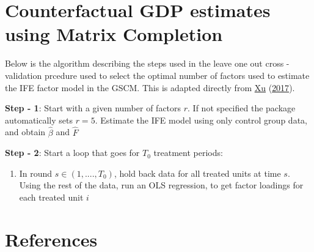 \documentclass[12pt,nobind, a4paper]{reedthesis}
\providecommand{\tightlist}{%
	\setlength{\itemsep}{0pt}\setlength{\parskip}{0pt}}
\begin{document}
 \appendix

 \hypertarget{counterfactual-gdp-estimates-using-matrix-completion}{%
 \chapter{Counterfactual GDP estimates using Matrix Completion}\label{counterfactual-gdp-estimates-using-matrix-completion}}

 Below is the algorithm describing the steps used in the leave one out cross - validation prcedure used to select the optimal number of factors used to estimate the IFE factor model in the GSCM. This is adapted directly from \protect\hyperlink{ref-xu_generalized_2017}{Xu} (\protect\hyperlink{ref-xu_generalized_2017}{2017}).

 \textbf{Step - 1}: Start with a given number of factors \(r\). If not specified the package automatically sets \(r=5\). Estimate the IFE model using only control group data, and obtain \(\hat{\beta}\) and \(\hat{F}\)

 \textbf{Step - 2}: Start a loop that goes for \(T_{0}\) treatment periods:
 \begin{enumerate}
 \def\labelenumi{(\alph{enumi})}
 \tightlist
 \item
   In round \(s \in (1,....,T_{0})\), hold back data for all treated units at time \(s\). Using the rest of the data, run an OLS regression, to get factor loadings for each treated unit \(i\)
 \end{enumerate}
 \backmatter

 \hypertarget{references}{%
 \chapter*{References}\label{references}}


 \noindent

 \setlength{\parindent}{-0.20in}
\end{document}
